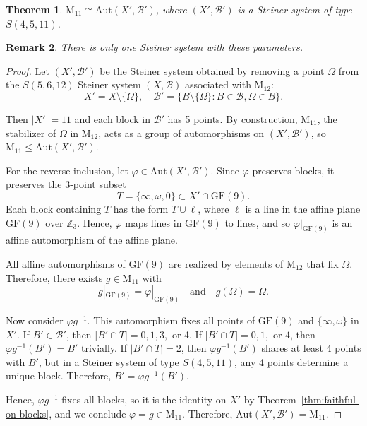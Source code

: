 \documentclass[12pt,a4paper,openany]{book}
\newtheorem{theorem}{Theorem}[section]
\newcommand{\GF}{\mathrm{GF}}
\newcommand{\Aut}{\mathrm{Aut}}
\newcommand{\Z}{\mathbb{Z}}
\newtheorem{remark}[theorem]{Remark}
\begin{document}
\begin{theorem}\label{thm:M11-aut}
$\mathrm{M}_{11} \cong \Aut(X', \mathscr{B}')$, where $(X', \mathscr{B}')$ is a Steiner system of type $S(4,5,11)$.
\end{theorem}

\begin{remark}
There is only one Steiner system with these parameters.
\end{remark}

\begin{proof}
Let $(X', \mathscr{B}')$ be the Steiner system obtained by removing a point $\Omega$ from the $S(5,6,12)$ Steiner system $(X, \mathscr{B})$ associated with $\mathrm{M}_{12}$:
\[
X' = X \setminus \{\Omega\}, \quad \mathscr{B}' = \{B \setminus \{\Omega\} : B \in \mathscr{B}, \Omega \in B\}.
\]

Then $|X'| = 11$ and each block in $\mathscr{B}'$ has 5 points. By construction, $\mathrm{M}_{11}$, the stabilizer of $\Omega$ in $\mathrm{M}_{12}$, acts as a group of automorphisms on $(X', \mathscr{B}')$, so $\mathrm{M}_{11} \leq \Aut(X', \mathscr{B}')$.

For the reverse inclusion, let $\varphi \in \Aut(X', \mathscr{B}')$. Since $\varphi$ preserves blocks, it preserves the 3-point subset
\[
T = \{\infty, \omega, 0\} \subset X' \cap \GF(9).
\]
Each block containing $T$ has the form $T \cup \ell$, where $\ell$ is a line in the affine plane $\GF(9)$ over $\Z_3$. Hence, $\varphi$ maps lines in $\GF(9)$ to lines, and so $\varphi|_{\GF(9)}$ is an affine automorphism of the affine plane.

All affine automorphisms of $\GF(9)$ are realized by elements of $\mathrm{M}_{12}$ that fix $\Omega$. Therefore, there exists $g \in \mathrm{M}_{11}$ with
\[
g|_{\GF(9)} = \varphi|_{\GF(9)} \quad \text{and} \quad g(\Omega) = \Omega.
\]

Now consider $\varphi g^{-1}$. This automorphism fixes all points of $\GF(9)$ and $\{\infty, \omega\}$ in $X'$. If $B' \in \mathscr{B}'$, then $|B' \cap T| = 0,1,3,$ or 4. If $|B' \cap T| = 0,1,$ or $4$, then $\varphi g^{-1}(B') = B'$ trivially. If $|B' \cap T| = 2$, then $\varphi g^{-1}(B')$ shares at least 4 points with $B'$, but in a Steiner system of type $S(4,5,11)$, any 4 points determine a unique block. Therefore, $B' = \varphi g^{-1}(B')$.

Hence, $\varphi g^{-1}$ fixes all blocks, so it is the identity on $X'$ by Theorem~\ref{thm:faithful-on-blocks}, and we conclude $\varphi = g \in \mathrm{M}_{11}$. Therefore, $\Aut(X', \mathscr{B}') = \mathrm{M}_{11}$.
\end{proof}
\end{document}
